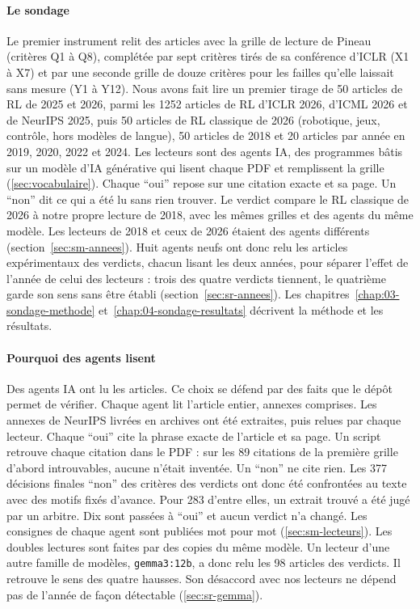 \paragraph{Le sondage}
Le premier instrument relit des articles avec la grille de lecture de Pineau (critères Q1 à Q8),
complétée par sept critères tirés de sa conférence d'ICLR (X1 à X7) et par une seconde grille de douze
critères pour les failles qu'elle laissait sans mesure (Y1 à Y12). Nous avons fait lire un premier tirage de
50 articles de RL de 2025 et 2026, parmi les \num{1252} articles de RL d'ICLR 2026, d'ICML 2026 et de
NeurIPS 2025, puis 50 articles de RL classique de 2026 (robotique, jeux, contrôle, hors modèles de
langue), 50 articles de 2018 et 20 articles par année en 2019, 2020, 2022 et 2024. Les lecteurs sont
des agents IA, des programmes bâtis sur un modèle d'IA générative qui lisent chaque PDF et remplissent
la grille (\cref{sec:vocabulaire}). Chaque \enquote{oui} repose sur une citation
exacte et sa page. Un \enquote{non} dit ce qui a été lu sans rien trouver. Le verdict compare le RL classique de 2026 à notre propre lecture de 2018, avec les
mêmes grilles et des agents du même modèle. Les lecteurs de 2018 et ceux de 2026 étaient des agents
différents (section~\ref{sec:sm-annees}). Huit agents neufs ont donc relu les articles expérimentaux
des verdicts, chacun lisant les deux années, pour séparer l'effet de l'année de celui des lecteurs : trois des quatre verdicts
tiennent, le quatrième garde son sens sans être établi (section~\ref{sec:sr-annees}). Les chapitres~\ref{chap:03-sondage-methode} et~\ref{chap:04-sondage-resultats} décrivent
la méthode et les résultats.

\paragraph{Pourquoi des agents lisent}
Des agents IA ont lu les articles. Ce choix se défend par des faits que le dépôt permet de vérifier.
Chaque agent lit l'article entier, annexes comprises. Les annexes de NeurIPS livrées en archives ont
été extraites, puis relues par chaque lecteur. Chaque \enquote{oui} cite la phrase exacte de l'article
et sa page. Un script retrouve chaque citation dans le PDF : sur les 89 citations de la première grille
d'abord introuvables, aucune n'était inventée. Un \enquote{non} ne cite rien. Les 377 décisions
finales \enquote{non} des critères des verdicts ont donc été confrontées au texte avec des motifs fixés
d'avance. Pour 283 d'entre elles, un extrait trouvé a été jugé par un arbitre. Dix sont passées à
\enquote{oui} et aucun verdict n'a changé. Les consignes de chaque agent sont publiées mot pour mot
(\cref{sec:sm-lecteurs}). Les doubles lectures sont faites par des copies du même modèle. Un lecteur
d'une autre famille de modèles, \texttt{gemma3:12b}, a donc relu les 98 articles des verdicts. Il
retrouve le sens des quatre hausses. Son désaccord avec nos lecteurs ne dépend pas de l'année de façon
détectable (\cref{sec:sr-gemma}).

